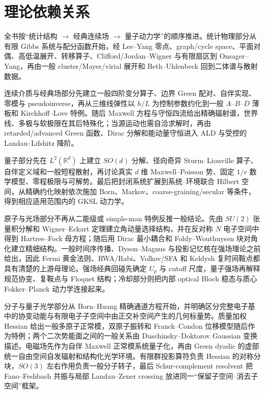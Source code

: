 \chapter*{理论依赖关系}

全书按“统计结构 $\to$ 经典连续场 $\to$ 量子动力学”的顺序推进。统计物理部分从有限 Gibbs 系统与配分函数开始，经 Lee--Yang 零点、graph/cycle space、平面对偶、高低温展开、转移算子、Clifford/Jordan--Wigner 与有限扇区到 Onsager--Yang，再由一般 cluster/Mayer/virial 展开和 Beth--Uhlenbeck 回到二体谱与散射数据。

连续介质与经典场部分先建立一般四阶变分算子、边界 Green 配对、自伴实现、零模与 pseudoinverse，再从三维线弹性以 $h/L$ 为控制参数约化到一般 $A$--$B$--$D$ 薄板和 Kirchhoff--Love 特例。随后 Maxwell 方程与守恒四流给出精确辐射谱，世界线、多极与软极限在其后特殊化；当源运动也需自洽求解时，再由 retarded/advanced Green 函数、Dirac 分解和能动量守恒进入 ALD 与受控的 Landau--Lifshitz 降阶。

量子部分先在 $L^2(\mathbb R^d)$ 上建立 $SO(d)$ 分解、径向奇异 Sturm--Liouville 算子、自伴定义域和一般短程散射，再讨论真实 $d$ 维 Maxwell--Poisson 势、固定 $1/r$ 数学模型、零程极限与可解势。最后把封闭系统扩展到系统--环境联合 Hilbert 空间，从精确约化映射依次施加 Born、Markov、coarse-graining/secular 等条件，得到相应适用范围内的 GKSL 动力学。


原子与光场部分不再从二能级或 simple-man 特例反推一般结论。先由 $SU(2)$ 张量积分解和 Wigner--Eckart 定理建立角动量选择结构，并在反对称 $N$ 电子空间中得到 Hartree--Fock 母方程；随后用 Dirac 最小耦合和 Foldy--Wouthuysen 块对角化建立精细结构。一般时间序传播、Dyson--Magnus 与投影记忆核在强场理论之前给出，因此 Fermi 黄金法则、RWA/Rabi、Volkov/SFA 和 Keldysh 复时间鞍点都具有清楚的上游母理论。强场经典回碰先确定 $U_p$ 与 cutoff 尺度，量子强场再解释规范协变、复鞍点与 Floquet 结构；冷却部分则把内部 optical Bloch 稳态与质心 Fokker--Planck 动力学连接起来。

分子与量子光学部分从 Born--Huang 精确通道方程开始，并明确区分完整电子基中的协变动能与有限电子子空间中由正交补空间产生的几何标量势。质量加权 Hessian 给出一般多原子正常模，双原子振转和 Franck--Condon 位移模型随后作为特例；两个二次势能面之间的一般关系由 Duschinsky--Doktorov Gaussian 变换描述。电磁场先作为自伴 Maxwell 正常模系统量子化，再由 Green dyadic 的虚部统一自由空间自发辐射和结构化光学环境。有限群投影算符负责 Hessian 的对称分块，$SO(3)$ 左右作用负责一般分子转子，最后 Schur-complement resolvent 把 Fano--Feshbach 共振与局部 Landau--Zener crossing 放进同一“保留子空间--消去子空间”框架。
